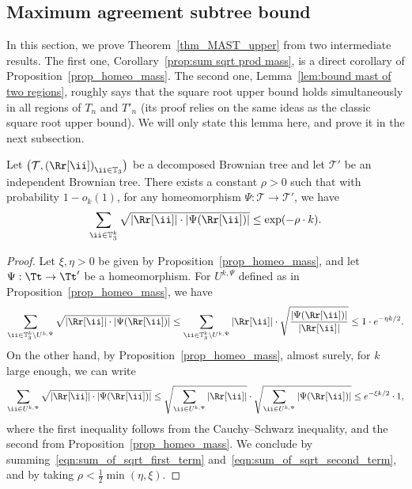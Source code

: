 \subsection{Maximum agreement subtree bound}
In this section, we prove Theorem~\ref{thm_MAST_upper} from two intermediate results.
The first one, Corollary~\ref{prop:sum sqrt prod mass}, is a direct corollary of Proposition~\ref{prop_homeo_mass}. The second one, Lemma~\ref{lem:bound mast of two regions}, roughly says that the square root upper bound holds simultaneously in all regions of $T_n$ and $T'_n$ (its proof relies on the same ideas as the classic square root upper bound).
We will only state this lemma here, and prove it in the next subsection.
\begin{corollary}\label{prop:sum sqrt prod mass}
Let $\left( \mathcal{T}, \left( \Rr[\ii] \right)_{\ii \in \mathbb{T}_3} \right)$ be a decomposed Brownian tree and let $\mathcal{T}'$ be an independent Brownian tree. There exists a constant $\rho>0$ such that with probability $1-o_k(1)$, for any homeomorphism $\Psi: \mathcal T \rightarrow \mathcal{T}'$, we have\vspace*{-3pt}
\begin{align*}
\sum_{\ii \in \mathbb{T}_3^k} \sqrt{|\Rr[\ii] | \cdot |\Psi(\Rr[\ii] )|} \leq \exp(- \rho \cdot k).
\end{align*}
\end{corollary}
\begin{proof}
Let $\xi, \eta>0$ be given by Proposition~\ref{prop_homeo_mass}, and let $\Psi : \Tt \to \Tt'$ be a homeomorphism.
For $U^{k,\Psi}$ defined as in Proposition~\ref{prop_homeo_mass}, we have\vspace*{-3pt}
\begin{equation}\label{eqn:sum_of_sqrt_first_term}
\sum_{\ii \in \mathbb{T}_3^k\setminus U^{k,\Psi}} \sqrt{|\Rr[\ii] | \cdot |\Psi(\Rr[\ii] )|} \leq \sum_{\ii \in \mathbb{T}_3^k\setminus U^{k,\Psi}} |\Rr[\ii] | \cdot \sqrt{ \frac{|\Psi(\Rr[\ii] )|}{|\Rr[\ii] |}} \leq 1 \cdot e^{-\eta k/2}.
\end{equation}
On the other hand, by Proposition~\ref{prop_homeo_mass}, almost surely, for $k$ large enough, we can write\vspace*{-3pt}
\begin{equation}\label{eqn:sum_of_sqrt_second_term}
\sum_{\ii \in U^{k,\Psi}} \sqrt{|\Rr[\ii] | \cdot |\Psi(\Rr[\ii] )|} \leq \sqrt{\sum_{\ii \in U^{k,\Psi}} |\Rr[\ii] | }\cdot \sqrt{\sum_{\ii \in U^{k,\Psi}} |\Psi(\Rr[\ii] )|} \leq e^{-\xi k/2} \cdot 1,
\end{equation}
where the first inequality follows from the Cauchy--Schwarz inequality, and the second from Proposition~\ref{prop_homeo_mass}. We conclude by summing~\eqref{eqn:sum_of_sqrt_first_term} and~\eqref{eqn:sum_of_sqrt_second_term}, and by taking $\rho<\frac{1}{2}\min(\eta, \xi)$.
\end{proof}

